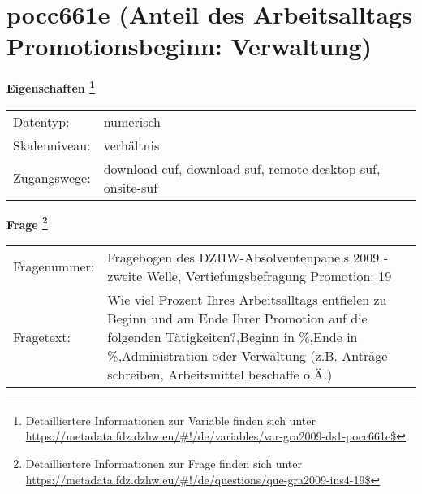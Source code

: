 
    \setcounter{footnote}{0}

    \vspace*{-1.8cm}
	\section{pocc661e (Anteil des Arbeitsalltags Promotionsbeginn: Verwaltung)}
	\label{section:pocc661e}



    \vspace*{0.5cm}
    \noindent\textbf{Eigenschaften
	\footnote{Detailliertere Informationen zur Variable finden sich unter
		\url{https://metadata.fdz.dzhw.eu/\#!/de/variables/var-gra2009-ds1-pocc661e$}}}\\
	\begin{tabularx}{\hsize}{@{}lX}
	Datentyp: & numerisch \\
	Skalenniveau: & verhältnis \\
	Zugangswege: &
	  download-cuf, 
	  download-suf, 
	  remote-desktop-suf, 
	  onsite-suf
 \\
    \end{tabularx}



				\vspace*{0.5cm}
                \noindent\textbf{Frage
	                \footnote{Detailliertere Informationen zur Frage finden sich unter
		              \url{https://metadata.fdz.dzhw.eu/\#!/de/questions/que-gra2009-ins4-19$}}}\\
				\begin{tabularx}{\hsize}{@{}lX}
					Fragenummer: &
					  Fragebogen des DZHW-Absolventenpanels 2009 - zweite Welle, Vertiefungsbefragung Promotion:
					  19
 \\
					Fragetext: & Wie viel Prozent Ihres Arbeitsalltags entfielen zu Beginn und am Ende Ihrer Promotion auf die folgenden Tätigkeiten?,Beginn in \%,Ende in \%,Administration oder Verwaltung (z.B. Anträge schreiben, Arbeitsmittel beschaffe o.Ä.) \\
				\end{tabularx}






